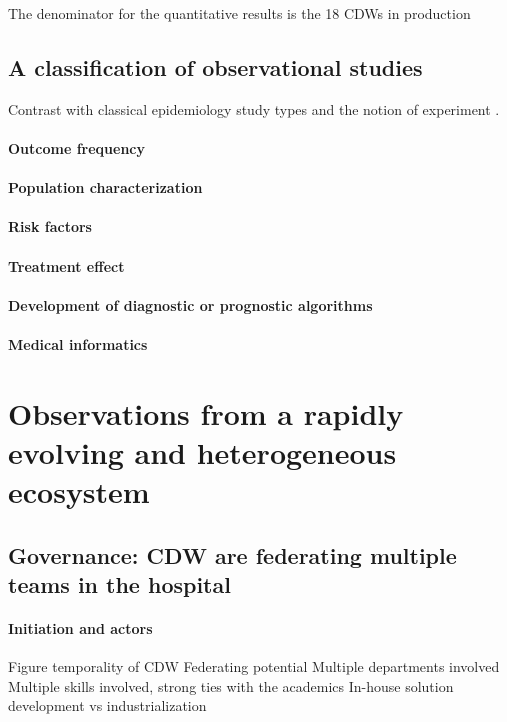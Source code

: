 \documentclass[french,12pt,twoside,a4paper]{book}
\begin{document}
The denominator for the quantitative results is the 18 CDWs in production

\subsection{A classification of observational
  studies}\label{subsec:cdw:classification}

Contrast with classical epidemiology study types and the notion of experiment \citep{rothman2012epidemiology}.

\paragraph{Outcome frequency}
\paragraph{Population characterization}
\paragraph{Risk factors}
\paragraph{Treatment effect}
\paragraph{Development of diagnostic or prognostic algorithms}
\paragraph{Medical informatics}


\section{Observations from a rapidly evolving and heterogeneous
  ecosystem}\label{sec:cdw:results}

\subsection{Governance: CDW are federating multiple teams in the
  hospital}\label{subsec:cdw:results:governance}
\paragraph{Initiation and actors}
Figure temporality of CDW
Federating potential
Multiple departments involved
Multiple skills involved, strong ties with the academics
In-house solution development vs industrialization
\end{document}
